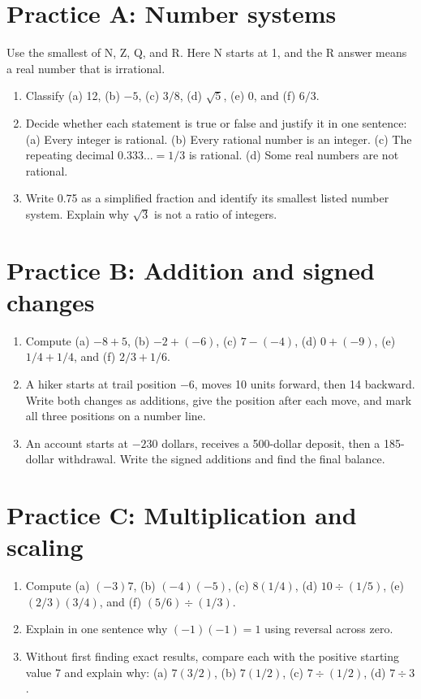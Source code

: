 \clearpage
\section*{Practice A: Number systems}
Use the smallest of N, Z, Q, and R. Here N starts at 1, and the R answer means a real number that is irrational.
\begin{enumerate}[label=A\arabic*.,leftmargin=2.5em,itemsep=10pt]
\item Classify (a) 12, (b) $-5$, (c) $3/8$, (d) $\sqrt5$, (e) 0, and (f) $6/3$.
\item Decide whether each statement is true or false and justify it in one sentence: (a) Every integer is rational. (b) Every rational number is an integer. (c) The repeating decimal $0.333\ldots=1/3$ is rational. (d) Some real numbers are not rational.
\item Write 0.75 as a simplified fraction and identify its smallest listed number system. Explain why $\sqrt3$ is not a ratio of integers.
\end{enumerate}
\section*{Practice B: Addition and signed changes}
\begin{enumerate}[label=B\arabic*.,leftmargin=2.5em,itemsep=10pt]
\item Compute (a) $-8+5$, (b) $-2+(-6)$, (c) $7-(-4)$, (d) $0+(-9)$, (e) $1/4+1/4$, and (f) $2/3+1/6$.
\item A hiker starts at trail position $-6$, moves 10 units forward, then 14 backward. Write both changes as additions, give the position after each move, and mark all three positions on a number line.
\item An account starts at $-230$ dollars, receives a 500-dollar deposit, then a 185-dollar withdrawal. Write the signed additions and find the final balance.
\end{enumerate}
\section*{Practice C: Multiplication and scaling}
\begin{enumerate}[label=C\arabic*.,leftmargin=2.5em,itemsep=10pt]
\item Compute (a) $(-3)7$, (b) $(-4)(-5)$, (c) $8(1/4)$, (d) $10\div(1/5)$, (e) $(2/3)(3/4)$, and (f) $(5/6)\div(1/3)$.
\item Explain in one sentence why $(-1)(-1)=1$ using reversal across zero.
\item Without first finding exact results, compare each with the positive starting value 7 and explain why: (a) $7(3/2)$, (b) $7(1/2)$, (c) $7\div(1/2)$, (d) $7\div3$.
\end{enumerate}
